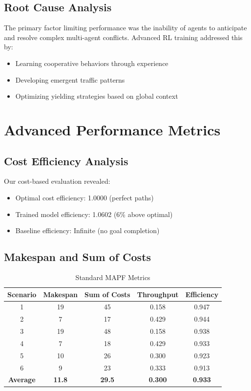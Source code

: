 \documentclass[12pt, a4paper]{report}
\begin{document}
\subsection{Root Cause Analysis}
The primary factor limiting performance was the inability of agents to anticipate and resolve complex multi-agent conflicts. Advanced RL training addressed this by:
\begin{itemize}
    \item Learning cooperative behaviors through experience
    \item Developing emergent traffic patterns
    \item Optimizing yielding strategies based on global context
\end{itemize}

\section{Advanced Performance Metrics}

\subsection{Cost Efficiency Analysis}
Our cost-based evaluation revealed:
\begin{itemize}
    \item Optimal cost efficiency: 1.0000 (perfect paths)
    \item Trained model efficiency: 1.0602 (6\% above optimal)
    \item Baseline efficiency: Infinite (no goal completion)
\end{itemize}

\subsection{Makespan and Sum of Costs}
\begin{table}[H]
\centering
\caption{Standard MAPF Metrics}
\begin{tabular}{|c|c|c|c|c|}
\hline
\textbf{Scenario} & \textbf{Makespan} & \textbf{Sum of Costs} & \textbf{Throughput} & \textbf{Efficiency} \\
\hline
1 & 19 & 45 & 0.158 & 0.947 \\
2 & 7 & 17 & 0.429 & 0.944 \\
3 & 19 & 48 & 0.158 & 0.938 \\
4 & 7 & 18 & 0.429 & 0.933 \\
5 & 10 & 26 & 0.300 & 0.923 \\
6 & 9 & 23 & 0.333 & 0.913 \\
\hline
\textbf{Average} & \textbf{11.8} & \textbf{29.5} & \textbf{0.300} & \textbf{0.933} \\
\hline
\end{tabular}
\end{table}
\end{document}
